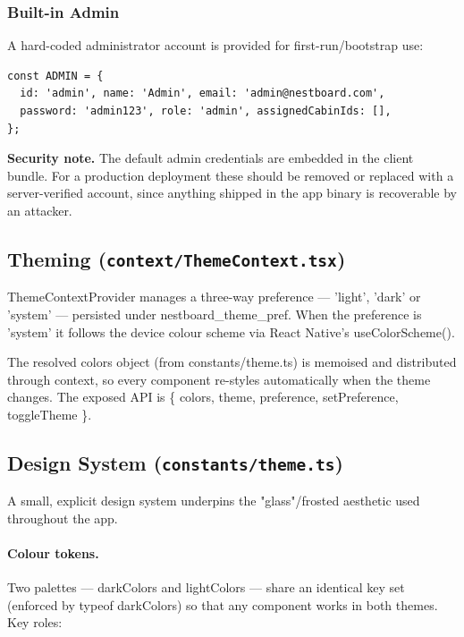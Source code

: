 \documentclass[11pt,a4paper]{article}
\newcommand{\code}[1]{\colorbox{codebg}{\ttfamily\small #1}}
\begin{document}
\subsubsection{Built-in Admin}

A hard-coded administrator account is provided for first-run/bootstrap use:

\begin{lstlisting}[language=tsx]
const ADMIN = {
  id: 'admin', name: 'Admin', email: 'admin@nestboard.com',
  password: 'admin123', role: 'admin', assignedCabinIds: [],
};
\end{lstlisting}

\begin{notebox}
\textbf{Security note.} The default admin credentials are embedded in the client
bundle. For a production deployment these should be removed or replaced with a
server-verified account, since anything shipped in the app binary is
recoverable by an attacker.
\end{notebox}

\subsection{Theming (\texttt{context/ThemeContext.tsx})}

\code{ThemeContextProvider} manages a three-way preference —
\code{'light'}, \code{'dark'} or \code{'system'} — persisted under
\code{nestboard\_theme\_pref}. When the preference is \code{'system'} it follows
the device colour scheme via React Native's \code{useColorScheme()}.

The resolved \code{colors} object (from \code{constants/theme.ts}) is memoised
and distributed through context, so every component re-styles automatically when
the theme changes. The exposed API is \code{\{ colors, theme, preference,
setPreference, toggleTheme \}}.

\subsection{Design System (\texttt{constants/theme.ts})}

A small, explicit design system underpins the "glass"/frosted aesthetic used
throughout the app.

\paragraph{Colour tokens.} Two palettes — \code{darkColors} and
\code{lightColors} — share an identical key set (enforced by
\code{typeof darkColors}) so that any component works in both themes. Key roles:
\end{document}
